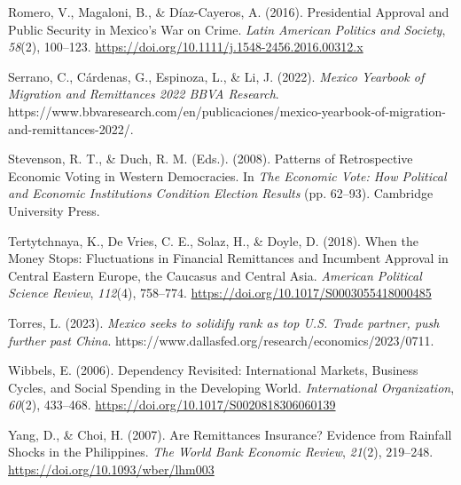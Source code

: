 \documentclass[
]{article}
\newlength{\cslhangindent}
\newlength{\cslentryspacingunit} %
\newenvironment{CSLReferences}[2] %
 {%
  \setlength{\parindent}{0pt}
  \ifodd #1
  \let\oldpar\par
  \def\par{\hangindent=\cslhangindent\oldpar}
  \fi
  \setlength{\parskip}{#2\cslentryspacingunit}
 }%
 {}
\begin{document}
\begin{CSLReferences}{1}{0}
\leavevmode{}%
Romero, V., Magaloni, B., \& Díaz-Cayeros, A. (2016). Presidential
{Approval} and {Public Security} in {Mexico}'s {War} on {Crime}.
\emph{Latin American Politics and Society}, \emph{58}(2), 100--123.
\url{https://doi.org/10.1111/j.1548-2456.2016.00312.x}

\leavevmode{}%
Serrano, C., Cárdenas, G., Espinoza, L., \& Li, J. (2022). \emph{Mexico
\textbar{} {Yearbook} of {Migration} and {Remittances} 2022 \textbar{}
{BBVA Research}}.
https://www.bbvaresearch.com/en/publicaciones/mexico-yearbook-of-migration-and-remittances-2022/.

\leavevmode{}%
Stevenson, R. T., \& Duch, R. M. (Eds.). (2008). Patterns of
{Retrospective Economic Voting} in {Western Democracies}. In \emph{The
{Economic Vote}: {How Political} and {Economic Institutions Condition
Election Results}} (pp. 62--93). {Cambridge University Press}.

\leavevmode{}%
Tertytchnaya, K., De Vries, C. E., Solaz, H., \& Doyle, D. (2018). When
the {Money Stops}: {Fluctuations} in {Financial Remittances} and
{Incumbent Approval} in {Central Eastern Europe}, the {Caucasus} and
{Central Asia}. \emph{American Political Science Review}, \emph{112}(4),
758--774. \url{https://doi.org/10.1017/S0003055418000485}

\leavevmode{}%
Torres, L. (2023). \emph{Mexico seeks to solidify rank as top {U}.{S}.
Trade partner, push further past {China}}.
https://www.dallasfed.org/research/economics/2023/0711.

\leavevmode{}%
Wibbels, E. (2006). Dependency {Revisited}: {International Markets},
{Business Cycles}, and {Social Spending} in the {Developing World}.
\emph{International Organization}, \emph{60}(2), 433--468.
\url{https://doi.org/10.1017/S0020818306060139}

\leavevmode{}%
Yang, D., \& Choi, H. (2007). Are {Remittances Insurance}? {Evidence}
from {Rainfall Shocks} in the {Philippines}. \emph{The World Bank
Economic Review}, \emph{21}(2), 219--248.
\url{https://doi.org/10.1093/wber/lhm003}

\end{CSLReferences}

\newpage
\end{document}
